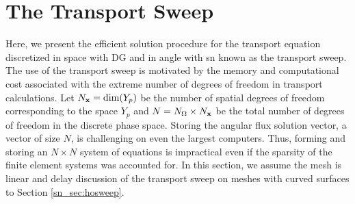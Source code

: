 \documentclass[../doc.tex]{subfiles}
\begin{document}
\section{The Transport Sweep} \label{sn_sec:sweep}
Here, we present the efficient solution procedure for the transport equation discretized in space with DG and in angle with \gls{sn} known as the transport sweep. The use of the transport sweep is motivated by the memory and computational cost associated with the extreme number of degrees of freedom in transport calculations. Let $N_{\boldsymbol{\mathrm{x}}} = \dim(Y_p)$ be the number of spatial degrees of freedom corresponding to the space $Y_p$ and $N = N_\Omega \times N_{\boldsymbol{\mathrm{x}}}$ be the total number of degrees of freedom in the discrete phase space. Storing the angular flux solution vector, a vector of size $N$, is challenging on even the largest computers. Thus, forming and storing an $N\times N$ system of equations is impractical even if the sparsity of the finite element systems was accounted for. In this section, we assume the mesh is linear and delay discussion of the transport sweep on meshes with curved surfaces to Section \ref{sn_sec:hosweep}. 
\end{document}
